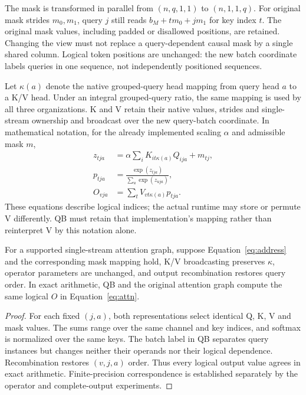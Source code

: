 The mask is transformed in parallel from $(n,q, 1,1)$ to $(n, 1,1,q)$. For original mask strides $m_0,m_1$, query $j$ still reads $b_M+t m_0+j m_1$ for key index $t$. The original mask values, including padded or disallowed positions, are retained. Changing the view must not replace a query-dependent causal mask by a single shared column. Logical token positions are unchanged: the new batch coordinate labels queries in one sequence, not independently positioned sequences.

Let $\kappa(a)$ denote the native grouped-query head mapping from query head $a$ to a K/V head. Under an integral grouped-query ratio, the same mapping is used by all three organizations. K and V retain their native values, strides and single-stream ownership and broadcast over the new query-batch coordinate. In mathematical notation, for the already implemented scaling $\alpha$ and admissible mask $m$,
\begin{align}
 z_{tja}&=\alpha\sum_i K_{it\kappa(a)}Q_{ija}+m_{tj},\\
 p_{tja}&=\frac{\exp(z_{tja})}{\sum_u\exp(z_{uja})},\\
 O_{vja}&=\sum_t V_{vt\kappa(a)}p_{tja}.
\label{eq:attn}
\end{align}
These equations describe logical indices; the actual runtime may store or permute V differently. QB must retain that implementation's mapping rather than reinterpret V by this notation alone.

\begin{proposition}
For a supported single-stream attention graph, suppose Equation~\eqref{eq:address} and the corresponding mask mapping hold, K/V broadcasting preserves $\kappa$, operator parameters are unchanged, and output recombination restores query order. In exact arithmetic, QB and the original attention graph compute the same logical $O$ in Equation~\eqref{eq:attn}.
\end{proposition}
\begin{proof}
For each fixed $(j,a)$, both representations select identical Q, K, V and mask values. The sums range over the same channel and key indices, and softmax is normalized over the same keys. The batch label in QB separates query instances but changes neither their operands nor their logical dependence. Recombination restores $(v,j,a)$ order. Thus every logical output value agrees in exact arithmetic. Finite-precision correspondence is established separately by the operator and complete-output experiments.
\end{proof}

